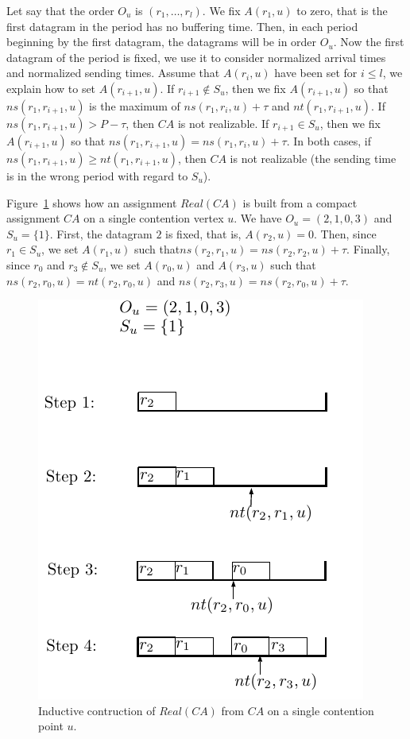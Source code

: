 \documentclass[english]{article}
\begin{document}
Let say that the order $O_u$ is $(r_1, \dots, r_l)$. We fix $A(r_1,u)$ to zero, that is the first
datagram in the period has no buffering time. Then, in each period beginning by the first datagram, the datagrams will be in order $O_u$. Now the first datagram of the period is fixed, we use it to consider normalized arrival times and normalized sending times.
Assume that $A(r_i,u)$ have been set for $i \leq l$, we explain how to 
set $A(r_{i+1},u)$. If $r_{i+1} \notin S_u$, then we fix $A(r_{i+1},u)$ so that $ns(r_1,r_{i+1},u)$ is the maximum of $ns(r_1,r_i,u) + \tau$ and $nt(r_1,r_{i+1},u)$. If $ns(r_1,r_{i+1},u) > P - \tau$, then $CA$ is not realizable. If $r_{i+1} \in S_u$, then we fix $A(r_{i+1},u)$ so that $ns(r_1, r_{i+1},u) = ns(r_1,r_i,u) + \tau$. In both cases, if $ns(r_1, r_{i+1},u) \geq nt(r_1,r_{i+1},u)$, then $CA$ is not realizable (the sending time is in the wrong period with regard to $S_u$). 

Figure~\ref{fig:compacttoassignment} shows how an assignment $Real(CA)$ is built from a compact assignment $CA$ on a single contention vertex $u$. We have $O_u = (2,1,0,3)$ and $S_u = \{1\}$. First, the datagram $2$ is fixed, that is, $A(r_2,u)=0$. Then, since $r_1 \in S_u$, we set $A(r_1,u)$ such that$ ns(r_2,r_1,u) = ns(r_2,r_2,u) + \tau$. 
Finally, since $r_0$ and $r_3 \notin S_u$, we set $A(r_0,u)$ and $A(r_3,u)$ such that $ns(r_2,r_0,u) = nt(r_2,r_0,u)$ and  $ns(r_2,r_3,u) = ns(r_2,r_0,u) + \tau$.
\begin{figure}[!h]
	\centering
	\includegraphics[scale=1]{compacttoassignment}
\caption{Inductive contruction of $Real(CA)$ from $CA$ on a single contention point $u$. }
\label{fig:compacttoassignment}
\end{figure}
\end{document}
